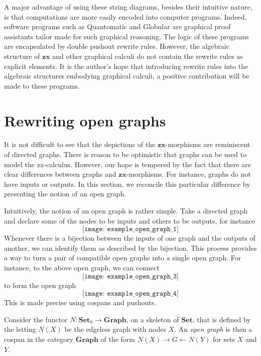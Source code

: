 \documentclass[a4paper,UKenglish]{lipics-v2016}
\begin{document}
A major advantage of using these string diagrams, besides their intuitive nature, is that computations are more easily encoded into computer programs.  Indeed, software programs such as Quantomatic \cite{BarKissingerVicary_Globular,DixonDuncanKissinger_QuantomaticWebsite} and Globular \cite{BarKissingerVicary_Globular} are graphical proof assistants tailor made for such graphical reasoning.  The logic of these programs are encapsulated by double pushout rewrite rules.  However, the algebraic structure of $\mathbf{zx}$ and other graphical calculi do not contain the rewrite rules as explicit elements.  It is the author's hope that introducing rewrite rules into the algebraic structures embodying graphical calculi, a positive contribution will be made to these programs.  

\section{Rewriting open graphs}
\label{sec:RewritingOpenGraphs}

It is not difficult to see that the depictions of the $\mathbf{zx}$-morphisms are reminiscent of directed graphs.  There is reason to be optimistic that graphs can be used to model the zx-calculus.  However, our hope is tempered by the fact that there are clear differences between graphs and $\mathbf{zx}$-morphisms.  For instance, graphs do not have inputs or outputs. In this section, we reconcile this particular difference by presenting the notion of an open graph.

Intuitively, the notion of an open graph is rather simple.  Take a directed graph and declare some of the nodes to be inputs and others to be outputs, for instance
\[
\texttt{[image: example\_open\_graph\_1]}
\]
Whenever there is a bijection between the inputs of one graph and the outputs of another, we can identify them as described by the bijection.  This process provides a way to turn a pair of compatible open graphs into a single open graph.  For instance, to the above open graph, we can connect 
\[
\texttt{[image: example\_open\_graph\_3]}
\]
to form the open graph
\[
\texttt{[image: example\_open\_graph\_4]}
\]
This is made precise using cospans and pushouts. 

\begin{definition}
	\label{def:Open Graph}
	Consider the functor $N \colon \mathbf{Set}_0 \to \mathbf{Graph}$, on a skeleton of $\mathbf{Set}$, that is defined by the letting $N(X)$ be the edgeless graph with nodes $X$.  An \emph{open graph} is then a cospan in the category $\mathbf{Graph}$ of the form $N(X) \to G \gets N(Y)$ for sets $X$ and $Y$.
\end{definition}
\end{document}
